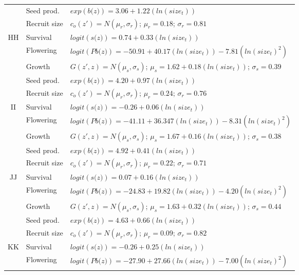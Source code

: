 \documentclass[12pt, letterpaper]{article}
\begin{document}
\begin{spacing}{1.3}
\begin{longtable}[ht!]{c|l|p{}}
         & Seed prod.  & $exp(\textit{b(z)}) = 3.06 + 1.22(ln(size_t))$  \\
         \rowcolor[gray]{.95}& Recruit size  &  $c_o(z') = N(\mu_r, \sigma_r)$; $\mu_r = 0.18$; $\sigma_r = 0.81$ \\ \hline
         HH  &  Survival  &  $logit(\textit{s(z)})= 0.74+0.33(ln(size_t))$ \\
         \rowcolor[gray]{.95}& Flowering  & $logit(\textit{Pb(z)})  = -50.91 + 40.17(ln(size_t)) -7.81(ln(size_t)^2)$ \\
         & Growth  &  $G(z',z) = N(\mu_s, \sigma_s)$; $\mu_s = 1.62 + 0.18(ln(size_t))$; $\sigma_s = 0.39$\\
         \rowcolor[gray]{.95}& Seed prod.  & $exp(\textit{b(z)}) = 4.20 + 0.97(ln(size_t))$  \\
         & Recruit size  &  $c_o(z') = N(\mu_r, \sigma_r)$; $\mu_r = 0.24$; $\sigma_r = 0.76$ \\ 
         \hline
         \rowcolor[gray]{.95}II  &  Survival  &  $logit(\textit{s(z)})= -0.26+0.06(ln(size_t))$ \\
         & Flowering  & $logit(\textit{Pb(z)})  = -41.11 + 36.347(ln(size_t)) -8.31(ln(size_t)^2)$ \\
         \rowcolor[gray]{.95}& Growth  &  $G(z',z) = N(\mu_s, \sigma_s)$; $\mu_s = 1.67 + 0.16(ln(size_t))$; $\sigma_s = 0.38$\\
         & Seed prod.  & $exp(\textit{b(z)}) = 4.92 + 0.41(ln(size_t))$  \\
         \rowcolor[gray]{.95}& Recruit size  &  $c_o(z') = N(\mu_r, \sigma_r)$; $\mu_r = 0.22$; $\sigma_r = 0.71$ \\
         \hline
         JJ  &  Survival  &  $logit(\textit{s(z)})= 0.07+0.16(ln(size_t))$ \\
         \rowcolor[gray]{.95}& Flowering  & $logit(\textit{Pb(z)})  = -24.83 + 19.82(ln(size_t)) -4.20(ln(size_t)^2)$ \\
         & Growth  &  $G(z',z) = N(\mu_s, \sigma_s)$; $\mu_s = 1.63 + 0.32(ln(size_t))$; $\sigma_s = 0.44$\\
         \rowcolor[gray]{.95}& Seed prod.  & $exp(\textit{b(z)}) = 4.63 + 0.66(ln(size_t))$  \\
         & Recruit size  &  $c_o(z') = N(\mu_r, \sigma_r)$; $\mu_r = 0.09$; $\sigma_r = 0.82$ \\
         \hline
         \rowcolor[gray]{.95}KK  &  Survival  &  $logit(\textit{s(z)})= -0.26+0.25(ln(size_t))$ \\
         & Flowering  & $logit(\textit{Pb(z)})  = -27.90 + 27.66(ln(size_t)) -7.00(ln(size_t)^2)$ \\

\end{longtable}
\end{spacing}
\end{document}
